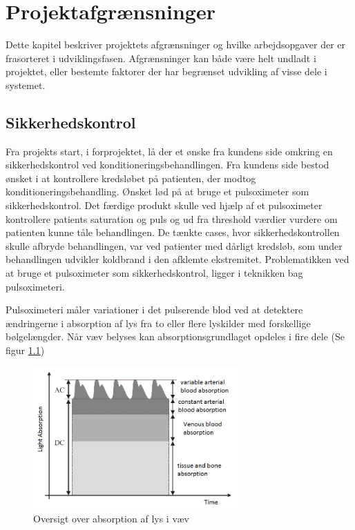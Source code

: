 \chapter{Projektafgrænsninger}
Dette kapitel beskriver projektets afgrænsninger og hvilke arbejdsopgaver der er frasorteret i udviklingsfasen. Afgrænsninger kan både være helt undladt i projektet, eller bestemte faktorer der har begrænset udvikling af visse dele i systemet. 

\section{Sikkerhedskontrol} \label{title:sikkerhedskontrol}
Fra projekts start, i forprojektet, lå der et ønske fra kundens side omkring en sikkerhedskontrol ved konditioneringsbehandlingen. Fra kundens side bestod ønsket i at kontrollere kredsløbet på patienten, der modtog konditioneringsbehandling. Ønsket lød på at bruge et pulsoximeter som sikkerhedskontrol. Det færdige produkt skulle ved hjælp af et pulsoximeter kontrollere patients saturation og puls og ud fra threshold værdier vurdere om patienten kunne tåle behandlingen. De tænkte cases, hvor sikkerhedskontrollen skulle afbryde behandlingen, var ved patienter med dårligt kredsløb, som under behandlingen udvikler koldbrand i den afklemte ekstremitet. Problematikken ved at bruge et pulsoximeter som sikkerhedskontrol, ligger i teknikken bag pulsoximeteri. 

Pulsoximeteri måler variationer i det pulserende blod ved at detektere ændringerne i absorption af lys fra to eller flere lyskilder med forskellige bølgelængder. Når væv belyses kan absorptionsgrundlaget opdeles i fire dele (Se figur \ref{fig:opticTissue})
\begin{figure}[H]
	\centering
	\includegraphics[width = 0.7\textwidth]{billeder/opticTissue.png}
	\caption{Oversigt over absorption af lys i væv}\label{fig:opticTissue}
\end{figure}

